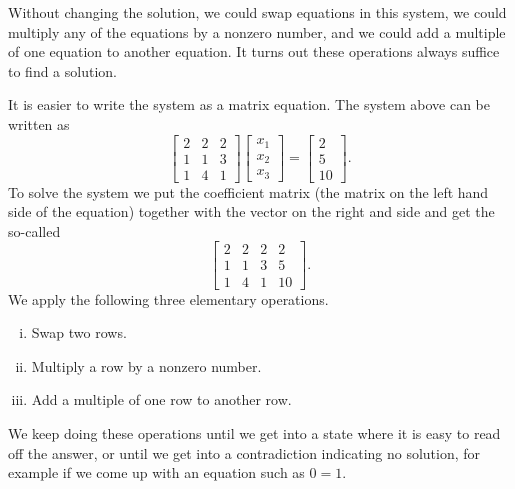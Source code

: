 \documentclass[12pt]{book}
\begin{document}
Without changing the solution,
we could swap equations in this system,
we could multiply any of the equations by a nonzero number, and
we could add a multiple of one equation to another equation.
It turns out these operations always suffice to find a solution.

It is easier to write the system as a matrix equation.
The system above can be
written as
\begin{equation*}
\begin{bmatrix}
2 & 2 & 2 \\
1 & 1 & 3 \\
1 & 4 & 1 
\end{bmatrix}
\begin{bmatrix}
x_1 \\
x_2 \\
x_3
\end{bmatrix} 
=
\begin{bmatrix}
2 \\
5 \\
10
\end{bmatrix} .
\end{equation*}
To solve the system we put the coefficient matrix (the matrix on the left
hand side of the equation) together with the vector on the right and side
and get the
so-called
\emph{}
\begin{equation*}
\left[
\begin{array}{ccc|c}
2 & 2 & 2 & 2 \\
1 & 1 & 3 & 5 \\
1 & 4 & 1 & 10
\end{array}
\right] .
\end{equation*}
We apply the following three elementary operations.
\begin{enumerate}[(i)]
\item Swap two rows.
\item Multiply a row by a nonzero number.
\item Add a multiple of one row to another row.
\end{enumerate}
We keep doing these operations until we get into a state where it is
easy to read off the answer, or until we get into a contradiction indicating
no solution, for example if we come up with an equation such as $0=1$.
\end{document}
